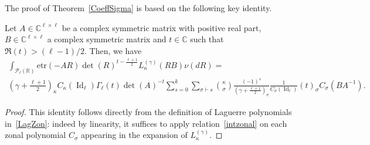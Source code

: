 \documentclass[AHL,Unicode,longabstracts,published]{cedram}
\DeclareMathOperator{\Id}{Id}
\newcommand{\clP}{\mathcal{P}}
\newcommand{\R}{\mathbb{R}}
\newcommand{\C}{\mathbb{C}}
\newcommand{\etr}[1]{\mathrm{etr}\left(#1\right)}
\begin{document}
The proof of Theorem~\ref{CoeffSigma} is based on the following key identity.
\begin{lemm}
Let $A\in \C^{\ell \times \ell}$ be a complex symmetric matrix with positive real part, $B\in \C^{\ell \times \ell}$ a complex symmetric matrix and $t \in \C$ such that $\Re(t)>(\ell-1)/2$. Then, we have
\begin{multline}\label{LaplaceLag}
\int_{\clP_{\ell}(\R)}
\etr{-AR}\det(R)^{t-\frac{\ell+1}{2}}L^{(\gamma)}_{\kappa}(RB) \nu(dR)= \\
\left(\gamma+\frac{\ell+1}{2}\right)_{\kappa} C_{\kappa}(\Id_{\ell})
\Gamma_{\ell}(t) \det(A)^{-t}
\sum_{s=0}^{k} \sum_{ \sigma \vdash s} \binom{\kappa}{\sigma} \frac{(-1)^s}{\left(\gamma+\frac{\ell+1}{2}\right)_{\sigma}}\frac{1}{C_{\sigma}(\Id_{\ell})} (t)_{\sigma} C_{\sigma}\left(BA^{-1}\right). 
\end{multline}
\end{lemm}

\begin{proof}
This identity follows directly from the definition of Laguerre polynomials in~\eqref{LagZon}: indeed by linearity, it suffices to apply relation~\eqref{intzonal} on each zonal polynomial $C_{\sigma}$ appearing in the expansion of $L_{\kappa}^{(\gamma)}$.
\end{proof}
\end{document}
